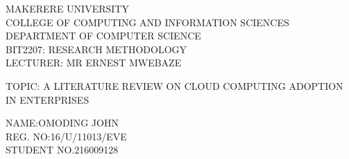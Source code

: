 \documentclass{article}                    %
\begin{document}
\begin{titlepage} %

	\centering %
	
	\scshape %
	
	\vspace*{\baselineskip} %
	
	
		
	\vspace{0.80\baselineskip} %
	
	{\LARGE MAKERERE UNIVERSITY\\ COLLEGE OF COMPUTING AND INFORMATION SCIENCES\\ DEPARTMENT OF COMPUTER SCIENCE\\BIT2207: RESEARCH METHODOLOGY\\LECTURER: MR ERNEST MWEBAZE\\} %

{\LARGE TOPIC: A LITERATURE REVIEW ON CLOUD COMPUTING  ADOPTION IN ENTERPRISES\\}
	
	\vspace{8.00\baselineskip} %
	

	
	
	\vspace{0.5\baselineskip} %
	
	{\scshape\Large NAME:OMODING JOHN\\REG. NO:16/U/11013/EVE\\STUDENT NO.216009128 \\} %
	
	\vspace{0.5\baselineskip} %
\end{titlepage}
\newpage
\end{document}
